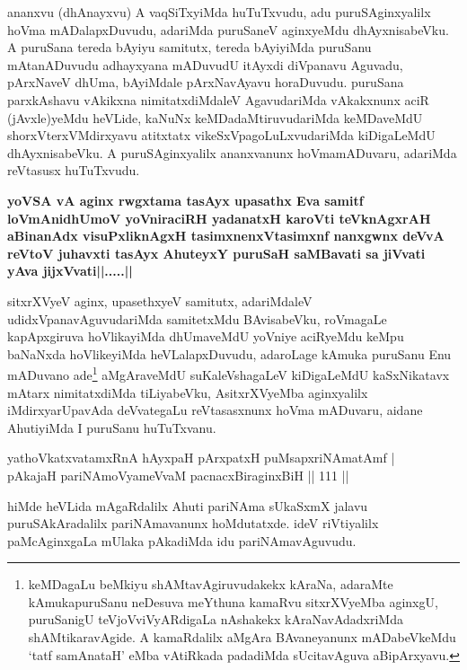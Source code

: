 \begin{artha}
ananxvu (dhAnayxvu) A vaqSiTxyiMda huTuTxvudu, adu puruSAginxyalilx
hoVma mADalapxDuvudu, adariMda puruSaneV aginxyeMdu dhAyxnisabeVku. A
puruSana tereda bAyiyu samitutx, tereda bAyiyiMda puruSanu
mAtanADuvudu adhayxyana mADuvudU itAyxdi diVpanavu Aguvadu, pArxNaveV
dhUma, bAyiMdale pArxNavAyavu horaDuvudu. puruSana parxkAshavu
vAkikxna nimitatxdiMdaleV AgavudariMda vAkakxnunx aciR (jAvxle)yeMdu
heVLide, kaNuNx keMDadaMtiruvudariMda keMDaveMdU shorxVterxVMdirxyavu
atitxtatx vikeSxVpagoLuLxvudariMda kiDigaLeMdU dhAyxnisabeVku. A
puruSAginxyalilx ananxvanunx hoVmamADuvaru, adariMda reVtasusx
huTuTxvudu. 

\textbf{yoVSA vA aginx rwgxtama tasAyx upasathx Eva samitf loVmAnidhUmoV yoVniraciRH yadanatxH karoVti teV\s knAgxrAH aBinanAdx visuPxliknAgxH tasimxnenxVtasimxnf nanxgwnx deVvA reVtoV juhavxti tasAyx AhuteyxY puruSaH saMBavati sa jiVvati yAva jijxVvati||.....||}
\end{artha}

\begin{artha}
sitxrXVyeV aginx, upasethxyeV samitutx, adariMdaleV
udidxVpanavAguvudariMda samitetxMdu BAvisabeVku, roVmagaLe
kapApxgiruva hoVlikayiMda dhUmaveMdU yoVniye aciRyeMdu keMpu baNaNxda
hoVlikeyiMda heVLalapxDuvudu, adaroLage kAmuka puruSanu Enu mADuvano
ade\footnote{keMDagaLu beMkiyu shAMtavAgiruvudakekx kAraNa, adaraMte
  kAmukapuruSanu neDesuva meYthuna kamaRvu sitxrXVyeMba aginxgU,
  puruSanigU teVjoVviVyARdigaLa nAshakekx kAraNavAdadxriMda
  shAMtikaravAgide. A kamaRdalilx aMgAra BAvaneyanunx mADabeVkeMdu
 `tatf samAnataH' eMba vAtiRkada padadiMda sUcitavAguva aBipArxyavu.} aMgAraveMdU suKaleVshagaLeV kiDigaLeMdU kaSxNikatavx
mAtarx nimitatxdiMda tiLiyabeVku, AsitxrXVyeMba aginxyalilx
iMdirxyarUpavAda deVvategaLu reVtasasxnunx hoVma mADuvaru, aidane
AhutiyiMda I puruSanu huTuTxvanu.
\end{artha}


\begin{shl}
yathoVkatxvatamxRnA hAyxpaH pArxpatxH puMsapxriNAmatAmf | \\
pAkajaH pariNAmoV\s yameVvaM pacnacxBiraginxBiH \hfill|| 111 || 
\end{shl}

\begin{artha}
hiMde heVLida mAgaRdalilx Ahuti pariNAma sUkaSxmX jalavu
puruSAkAradalilx pariNAmavanunx hoMdutatxde. ideV riVtiyalilx
paMcAginxgaLa mUlaka pAkadiMda idu pariNAmavAguvudu.
\end{artha}

